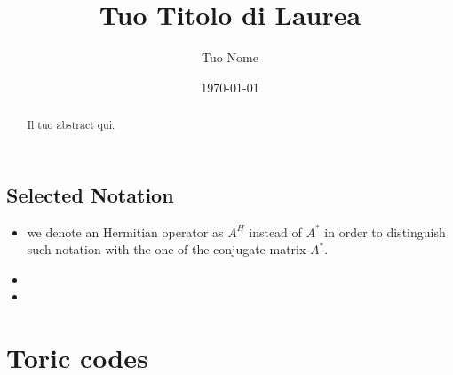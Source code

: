 \documentclass[12pt]{report}
\title{Tuo Titolo di Laurea}
\author{Tuo Nome}
\date{\today} %
\begin{document}
	\maketitle
	
	\begin{abstract}
		Il tuo abstract qui.
	\end{abstract}
	
	\tableofcontents
	
	\pagestyle{headings}
	
	
	\newpage
	\section*{Selected Notation}
	
	\begin{itemize}[label=\textbullet]
		\item we denote an Hermitian operator as $A^H$ instead of $A^*$ in order to distinguish such notation with the one of the conjugate matrix $A^*$.
		
		\item 
		
		\item 
		
	\end{itemize}
	
	
	\chapter{Toric codes}
	
\end{document}
